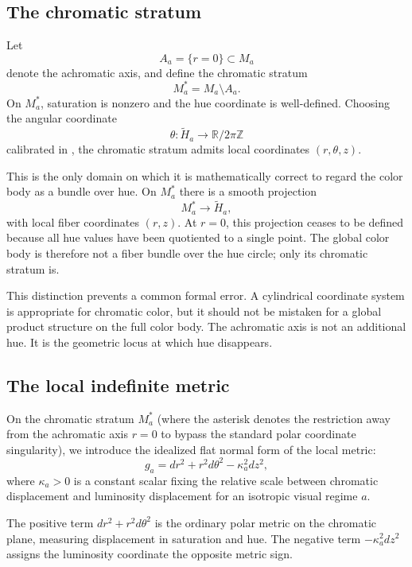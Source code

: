 \documentclass[preprint,12pt,authoryear]{elsarticle}
\theoremstyle{plain}
\theoremstyle{definition}
\theoremstyle{remark}
\begin{document}
\subsection{The chromatic stratum}
\label{subsec:chromatic-stratum}

\noindent Let
\[
A_a=\{r=0\}\subset M_a
\]
denote the achromatic axis, and define the chromatic stratum
\[
M_a^{\ast}=M_a\setminus A_a.
\]
On $M_a^{\ast}$, saturation is nonzero and the hue coordinate is well-defined. Choosing the angular coordinate
\[
\theta:\widetilde H_a\longrightarrow\mathbb{R}/2\pi\mathbb{Z}
\]
calibrated in , the chromatic stratum admits local coordinates $(r,\theta,z)$.

This is the only domain on which it is mathematically correct to regard the color body as a bundle over hue. On $M_a^{\ast}$ there is a smooth projection
\[
M_a^{\ast}\longrightarrow\widetilde H_a,
\]
with local fiber coordinates $(r,z)$. At $r=0$, this projection ceases to be defined because all hue values have been quotiented to a single point. The global color body is therefore not a fiber bundle over the hue circle; only its chromatic stratum is.

This distinction prevents a common formal error. A cylindrical coordinate system is appropriate for chromatic color, but it should not be mistaken for a global product structure on the full color body. The achromatic axis is not an additional hue. It is the geometric locus at which hue disappears.

\subsection{The local indefinite metric}
\label{subsec:local-indefinite-metric}

\noindent On the chromatic stratum $M_a^{\ast}$ (where the asterisk denotes the restriction away from the achromatic axis $r=0$ to bypass the standard polar coordinate singularity), we introduce the idealized flat normal form of the local metric:
\[
g_a=dr^{2}+r^{2}d\theta^{2}-\kappa_a^{2}dz^{2},
\]
where $\kappa_a>0$ is a constant scalar fixing the relative scale between chromatic displacement and luminosity displacement for an isotropic visual regime $a$.

The positive term $dr^{2}+r^{2}d\theta^{2}$ is the ordinary polar metric on the chromatic plane, measuring displacement in saturation and hue. The negative term $-\kappa_a^{2}dz^{2}$ assigns the luminosity coordinate the opposite metric sign.
\end{document}
